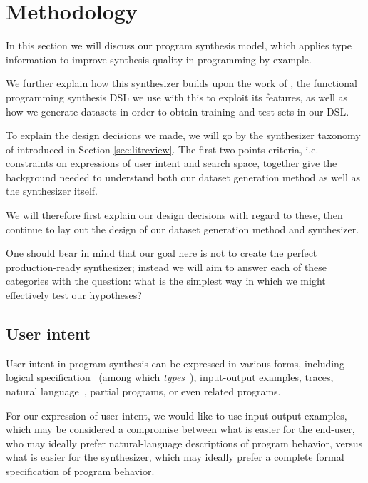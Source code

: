 \documentclass{article}
\begin{document}


\section{Methodology} %

In this section we will discuss our program synthesis model,
which applies type information to improve synthesis quality in programming by example.

We further explain how this synthesizer builds upon the work of \citet{nsps},
the functional programming synthesis DSL we use with this to exploit its features,
as well as how we generate datasets in order to obtain training and test sets in our DSL.

To explain the design decisions we made,
we will go by the synthesizer taxonomy of \citet{gulwani2017program} introduced in Section \ref{sec:litreview}.
The first two points criteria, i.e. constraints on expressions of user intent and search space,
together give the background needed to understand both our dataset generation method as well as the synthesizer itself.

We will therefore first explain our design decisions with regard to these,
then continue to lay out the design of our dataset generation method and synthesizer.

One should bear in mind that our goal here is not to create the perfect production-ready synthesizer;
instead we will aim to answer each of these categories with the question:
what is the simplest way in which we might effectively test our hypotheses?

\subsection{User intent}

User intent in program synthesis can be expressed in various forms, including logical specification~\citep{temporalstreamlogic} (among which \emph{types}~\citep{synquid}),
input-output examples, traces, natural language~\citep{abstractsyntaxnetworks},
partial programs, or even related programs.~\citep{gulwani2017program}

For our expression of user intent, we would like to use input-output examples,
which may be considered a compromise between what is easier for the end-user,
who may ideally prefer natural-language descriptions of program behavior,
versus what is easier for the synthesizer,
which may ideally prefer a complete formal specification of program behavior.
\end{document}
